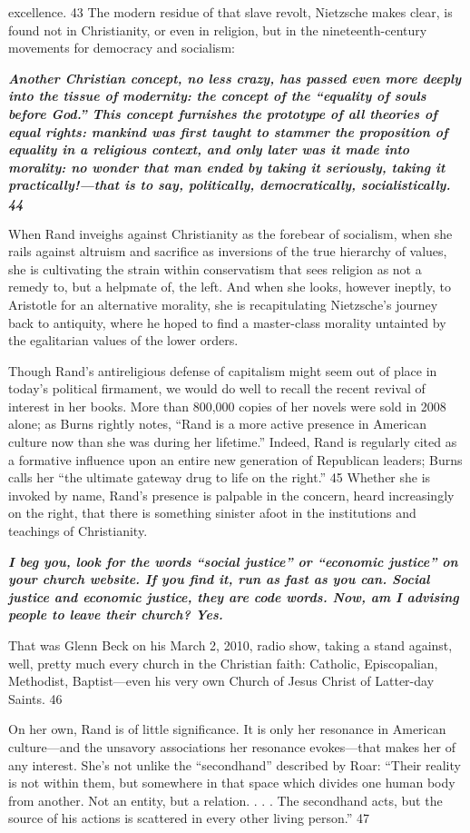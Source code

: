 excellence. {\color{blue} 43 } The modern residue of that slave revolt, Nietzsche makes clear, is found not in Christianity, or even in religion, but in the nineteenth-century movements for democracy and socialism:{\par} {\textbf{\textit{Another Christian concept, no less crazy, has passed even more deeply into the tissue of modernity: the concept of the “equality of souls before God.” This concept furnishes the prototype of all theories of equal rights: mankind was first taught to stammer the proposition of equality in a religious context, and only later was it made into morality: no wonder that man ended by taking it seriously, taking it practically!—that is to say, politically, democratically, socialistically. {\color{blue} 44 } } } }{\par} When Rand inveighs against Christianity as the forebear of socialism, when she rails against altruism and sacrifice as inversions of the true hierarchy of values, she is cultivating the strain within conservatism that sees religion as not a remedy to, but a helpmate of, the left. And when she looks, however ineptly, to Aristotle for an alternative morality, she is recapitulating Nietzsche’s journey back to antiquity, where he hoped to find a master-class morality untainted by the egalitarian values of the lower orders.{\par} Though Rand’s antireligious defense of capitalism might seem out of place in today’s political firmament, we would do well to recall the recent revival of interest in her books. More than 800,000 copies of her novels were sold in 2008 alone; as Burns rightly notes, “Rand is a more active presence in American culture now than she was during her lifetime.” Indeed, Rand is regularly cited as a formative influence upon an entire new generation of Republican leaders; Burns calls her “the ultimate gateway drug to life on the right.” {\color{blue} 45 } Whether she is invoked by name, Rand’s presence is palpable in the concern, heard increasingly on the right, that there is something sinister afoot in the institutions and teachings of Christianity.{\par} {\textbf{\textit{I beg you, look for the words “social justice” or “economic justice” on your church website. If you find it, run as fast as you can. Social justice and economic justice, they are code words. Now, am I advising people to leave their church? Yes.} } }{\par} That was Glenn Beck on his March 2, 2010, radio show, taking a stand against, well, pretty much every church in the Christian faith: Catholic, Episcopalian, Methodist, Baptist—even his very own Church of Jesus Christ of Latter-day Saints. {\color{blue} 46 } {\par} On her own, Rand is of little significance. It is only her resonance in American culture—and the unsavory associations her resonance evokes—that makes her of any interest. She’s not unlike the “secondhand” described by Roar: “Their reality is not within them, but somewhere in that space which divides one human body from another. Not an entity, but a relation. . . . The secondhand acts, but the source of his actions is scattered in every other living person.” {\color{blue} 47 } 